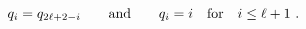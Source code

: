 \begin{equation}
q_{i}=q_{2\ell +2-i}\qquad {\rm and} \qquad q_{i}=i\quad {\rm for }
\quad i\leq
\ell +1~.  \label{ql}
\end{equation}


